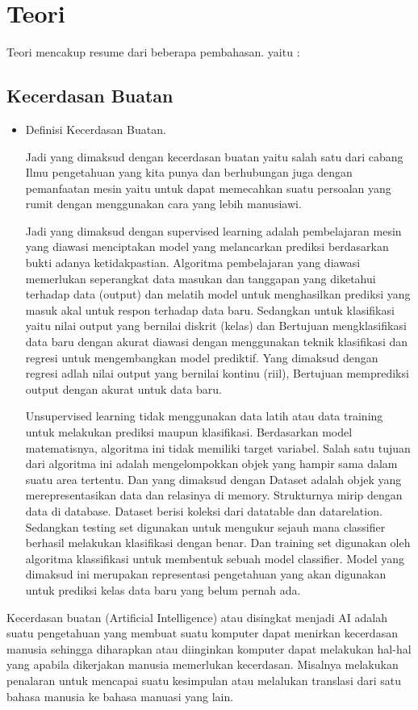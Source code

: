 \section{Teori}
Teori mencakup resume dari beberapa pembahasan. yaitu :

\subsection {Kecerdasan Buatan}

\begin{itemize}
\item Definisi Kecerdasan Buatan.
\par Jadi yang dimaksud dengan  kecerdasan buatan yaitu  salah satu dari cabang Ilmu pengetahuan yang kita punya dan  berhubungan juga dengan pemanfaatan mesin yaitu untuk dapat memecahkan suatu  persoalan yang rumit dengan  menggunakan cara yang lebih manusiawi.
\par Jadi yang dimaksud dengan supervised learning  adalah pembelajaran mesin yang diawasi menciptakan model yang melancarkan prediksi berdasarkan bukti adanya ketidakpastian. Algoritma pembelajaran yang diawasi memerlukan seperangkat data masukan dan tanggapan yang diketahui terhadap data (output) dan melatih model untuk menghasilkan prediksi yang masuk akal untuk respon terhadap data baru. Sedangkan untuk klasifikasi yaitu nilai output yang  bernilai diskrit (kelas) dan Bertujuan mengklasifikasi data baru dengan akurat diawasi dengan menggunakan teknik klasifikasi dan regresi untuk mengembangkan model prediktif. Yang dimaksud dengan regresi adlah nilai output yang bernilai kontinu (riil), Bertujuan memprediksi output dengan akurat untuk data baru.
\par Unsupervised learning tidak menggunakan data latih atau data training untuk melakukan prediksi maupun klasifikasi. Berdasarkan model matematisnya, algoritma ini tidak memiliki target variabel. Salah satu tujuan dari algoritma ini adalah mengelompokkan objek yang hampir sama dalam suatu area tertentu. Dan yang dimaksud dengan  Dataset adalah objek yang merepresentasikan data dan relasinya di memory. Strukturnya mirip dengan data di database. Dataset berisi koleksi dari datatable dan datarelation. Sedangkan testing set digunakan untuk mengukur sejauh mana classifier berhasil melakukan klasifikasi dengan benar. Dan training set digunakan oleh algoritma klassifikasi untuk membentuk sebuah model classifier. Model yang dimaksud ini merupakan representasi pengetahuan yang akan digunakan untuk prediksi kelas data baru yang belum pernah ada.
\end{itemize} 
Kecerdasan buatan (Artificial Intelligence) atau disingkat menjadi AI adalah suatu pengetahuan yang membuat suatu komputer dapat menirkan  kecerdasan manusia sehingga diharapkan atau diinginkan komputer dapat melakukan hal-hal yang apabila dikerjakan manusia memerlukan kecerdasan. Misalnya melakukan penalaran untuk mencapai suatu kesimpulan atau melalukan translasi dari satu bahasa manusia ke bahasa manuasi yang lain.


